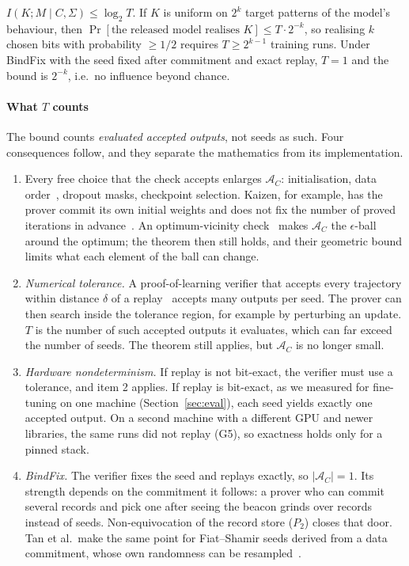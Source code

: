 \begin{theorem}\label{thm:grind}
$I(K;M\mid C,\Sigma)\le\log_2 T$. If $K$ is uniform on $2^k$ target patterns of the
model's behaviour, then $\Pr[\text{the released model realises }K]\le T\cdot 2^{-k}$, so
realising $k$ chosen bits with probability $\ge 1/2$ requires $T\ge 2^{k-1}$ training runs.
Under \textsf{BindFix} with the seed fixed after commitment and exact replay, $T=1$ and
the bound is $2^{-k}$, i.e.\ no influence beyond chance.
\end{theorem}

\paragraph{What $T$ counts}
The bound counts \emph{evaluated accepted outputs}, not seeds as such. Four consequences
follow, and they separate the mathematics from its implementation.
\begin{enumerate}
\item Every free choice that the check accepts enlarges $\mathcal A_C$: initialisation, data
  order~\cite{shumailov2021ordering}, dropout masks, checkpoint selection. Kaizen, for
  example, has the prover commit its own initial weights and does not fix the number of
  proved iterations in advance~\cite{abbaszadeh2024zkpot}. An optimum-vicinity check~\cite{tan2025zkpot} makes
  $\mathcal A_C$ the $\epsilon$-ball around the optimum; the theorem then still holds, and
  their geometric bound limits what each element of the ball can change.
\item \emph{Numerical tolerance.} A proof-of-learning verifier that accepts every trajectory
  within distance $\delta$ of a replay~\cite{jia2021pol,fang2023pol} accepts many outputs
  per seed. The prover can then search inside the tolerance region, for example by
  perturbing an update. $T$ is the number of such accepted outputs it evaluates, which can
  far exceed the number of seeds. The theorem still applies, but $\mathcal A_C$ is no longer
  small.
\item \emph{Hardware nondeterminism.} If replay is not bit-exact, the verifier must use a
  tolerance, and item 2 applies. If replay is bit-exact, as we measured for fine-tuning on
  one machine (Section~\ref{sec:eval}), each seed yields exactly one accepted output. On a
  second machine with a different GPU and newer libraries, the same runs did not replay
  (G5), so exactness holds only for a pinned stack.
\item \emph{\textsf{BindFix}.} The verifier fixes the seed and replays exactly, so
  $|\mathcal A_C|=1$. Its strength depends on the commitment it follows: a prover who can
  commit several records and pick one after seeing the beacon grinds over records instead of
  seeds. Non-equivocation of the record store ($P_2$) closes that door. Tan et al.\ make the
same point for Fiat--Shamir seeds derived from a data commitment, whose own randomness can be
resampled~\cite{tan2025zkpot}.
\end{enumerate}

